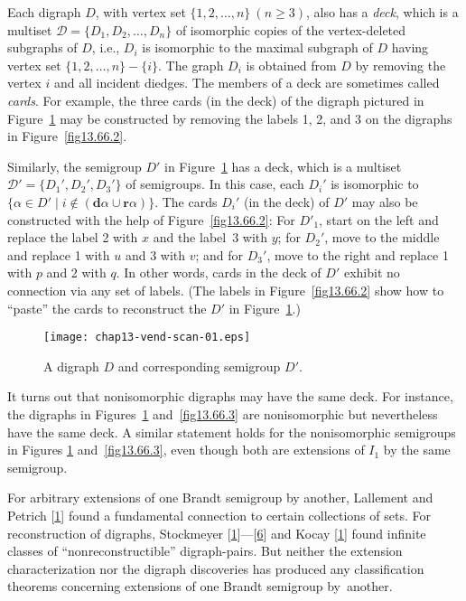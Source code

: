 \documentclass{surv-l}
\numberwithin{equation}{section}
\numberwithin{table}{section}
\numberwithin{figure}{section}
\theoremstyle{definition}
\begin{document}
Each digraph $D$, with vertex set $\{1, 2,
\ldots, n\}\ (n\geq 3)$, also has a \emph{deck}, which is a
multiset $\mathcal{D}=\{D_{1},D_{2},\ldots, D_{n}\}$ of isomorphic
copies of the vertex-deleted subgraphs of $D$, i.e., $D_{i}$ is
isomorphic to the maximal subgraph of $D$ having vertex set $\{1,
2,\ldots,n\}-\{i\}$. The graph $D_{i}$ is obtained from $D$ by
removing the vertex $i$ and all incident diedges. The members of a
deck are sometimes called \emph{cards}. For example, the three
cards (in the deck) of the digraph pictured in
Figure~\ref{fig13.66.1} may be constructed by removing the labels
1, 2, and 3 on the digraphs in Figure~\ref{fig13.66.2}.

Similarly, the semigroup $D'$ in Figure~\ref{fig13.66.1} has a
deck, which is a multiset $\mathcal{D}'=\{D_{1}', D_{2}',
D_{3}'\}$ of semigroups. In this case, each $D_{i}'$ is isomorphic
to $\{\alpha\in D'\mid i\not\in(\mathbf{d}\alpha\cup
\mathbf{r}\alpha)\}$. The cards $D_{i}'$ (in the deck) of $D'$ may
also be constructed with the help of Figure~\ref{fig13.66.2}: For
$D'_{1}$, start on the left and replace the label 2 with $x$ and the
label~3 with $y$; for $D_{2}'$, move to the middle and replace 1
with $u$ and 3 with $v$; and for $D_{3}'$, move to the right and
replace 1 with $p$ and 2 with $q$. In other words, cards in the
deck of $D'$ exhibit no connection via any set of labels. (The
labels in Figure~\ref{fig13.66.2} show how to ``paste'' the cards
to reconstruct the $D'$ in Figure~\ref{fig13.66.1}.)

\begin{figure}[!h]
\texttt{[image: chap13-vend-scan-01.eps]}
\caption{A digraph $D$ and corresponding semigroup $D'$.\label{fig13.66.1}}
\end{figure}

It turns out that nonisomorphic digraphs may have the same deck.
For instance, the digraphs in Figures~\ref{fig13.66.1}
and~\ref{fig13.66.3} are nonisomorphic but nevertheless have the
same deck. A similar statement holds for the nonisomorphic
semigroups in Figures \ref{fig13.66.1} and~\ref{fig13.66.3}, even
though both are extensions of $I_{1}$ by the same semigroup.

For arbitrary extensions of one Brandt semigroup by another,
Lallement and Petrich
[\hyperlink{bib39}{1}] found a fundamental connection to
certain collections of sets. For reconstruction of digraphs,
Stockmeyer
[\hyperlink{bib71}{1}]---[\hyperlink{bib71e}{6}]
and Kocay [\hyperlink{bib36}{1}]
found infinite classes of ``nonreconstructible'' digraph-pairs.
But neither the extension characterization nor the digraph
discoveries has produced any classification theorems concerning
extensions of one Brandt semigroup by~another.
\end{document}
